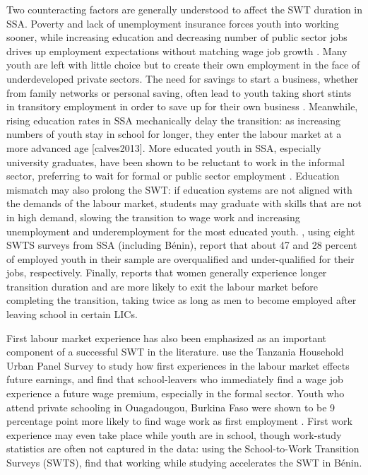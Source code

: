 \documentclass[
  a4paper, twoside, 12pt]{book}
\begin{document}
Two counteracting factors are generally understood to affect the SWT duration in SSA. Poverty and lack of unemployment insurance forces youth into working sooner, while increasing education and decreasing number of public sector jobs drives up employment expectations without matching wage job growth \autocite{manacorda2017}. Many youth are left with little choice but to create their own employment in the face of underdeveloped private sectors. The need for savings to start a business, whether from family networks or personal saving, often lead to youth taking short stints in transitory employment in order to save up for their own business \autocite{bridges2017,frazer2006}. Meanwhile, rising education rates in SSA mechanically delay the transition: as increasing numbers of youth stay in school for longer, they enter the labour market at a more advanced age {[}calves2013{]}. More educated youth in SSA, especially university graduates, have been shown to be reluctant to work in the informal sector, preferring to wait for formal or public sector employment \autocite{serneels2007}. Education mismatch may also prolong the SWT: if education systems are not aligned with the demands of the labour market, students may graduate with skills that are not in high demand, slowing the transition to wage work and increasing unemployment and underemployment for the most educated youth. \textcite{bandara2019}, using eight SWTS surveys from SSA (including Bénin), report that about 47 and 28 percent of employed youth in their sample are overqualified and under-qualified for their jobs, respectively. Finally, \textcite{manacorda2017} reports that women generally experience longer transition duration and are more likely to exit the labour market before completing the transition, taking twice as long as men to become employed after leaving school in certain LICs.

First labour market experience has also been emphasized as an important component of a successful SWT in the literature. \textcite{bridges2017} use the Tanzania Household Urban Panel Survey to study how first experiences in the labour market effects future earnings, and find that school-leavers who immediately find a wage job experience a future wage premium, especially in the formal sector. Youth who attend private schooling in Ouagadougou, Burkina Faso were shown to be 9 percentage point more likely to find wage work as first employment \autocite{calves2013}. First work experience may even take place while youth are in school, though work-study statistics are often not captured in the data: using the School-to-Work Transition Surveys (SWTS), \textcite{dedehouanou2019} find that working while studying accelerates the SWT in Bénin.
\end{document}
